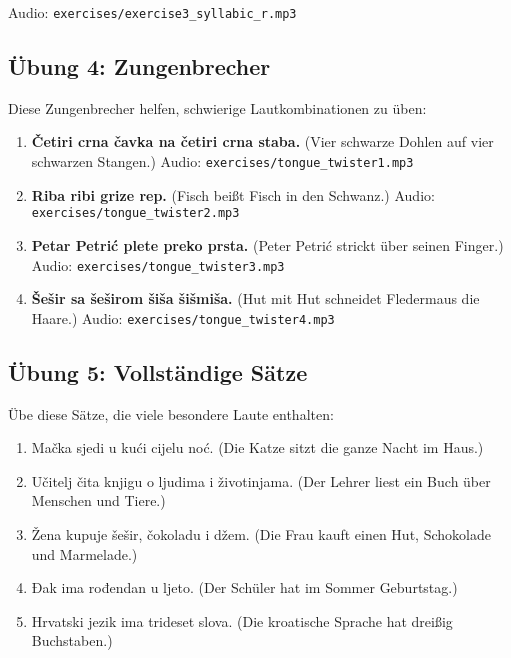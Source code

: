 Audio: \small\texttt{exercises/exercise3\_syllabic\_r.mp3}

\subsection{Übung 4: Zungenbrecher}

Diese Zungenbrecher helfen, schwierige Lautkombinationen zu üben:

\begin{enumerate}
    \item \textbf{Četiri crna čavka na četiri crna staba.}
    (Vier schwarze Dohlen auf vier schwarzen Stangen.)
    Audio: \small\texttt{exercises/tongue\_twister1.mp3}
    
    \item \textbf{Riba ribi grize rep.}
    (Fisch beißt Fisch in den Schwanz.)
    Audio: \small\texttt{exercises/tongue\_twister2.mp3}
    
    \item \textbf{Petar Petrić plete preko prsta.}
    (Peter Petrić strickt über seinen Finger.)
    Audio: \small\texttt{exercises/tongue\_twister3.mp3}
    
    \item \textbf{Šešir sa šeširom šiša šišmiša.}
    (Hut mit Hut schneidet Fledermaus die Haare.)
    Audio: \small\texttt{exercises/tongue\_twister4.mp3}
\end{enumerate}

\subsection{Übung 5: Vollständige Sätze}

Übe diese Sätze, die viele besondere Laute enthalten:

\begin{enumerate}
    \item Mačka sjedi u kući cijelu noć.
    (Die Katze sitzt die ganze Nacht im Haus.)
    
    \item Učitelj čita knjigu o ljudima i životinjama.
    (Der Lehrer liest ein Buch über Menschen und Tiere.)
    
    \item Žena kupuje šešir, čokoladu i džem.
    (Die Frau kauft einen Hut, Schokolade und Marmelade.)
    
    \item Đak ima rođendan u ljeto.
    (Der Schüler hat im Sommer Geburtstag.)
    
    \item Hrvatski jezik ima trideset slova.
    (Die kroatische Sprache hat dreißig Buchstaben.)
\end{enumerate}

